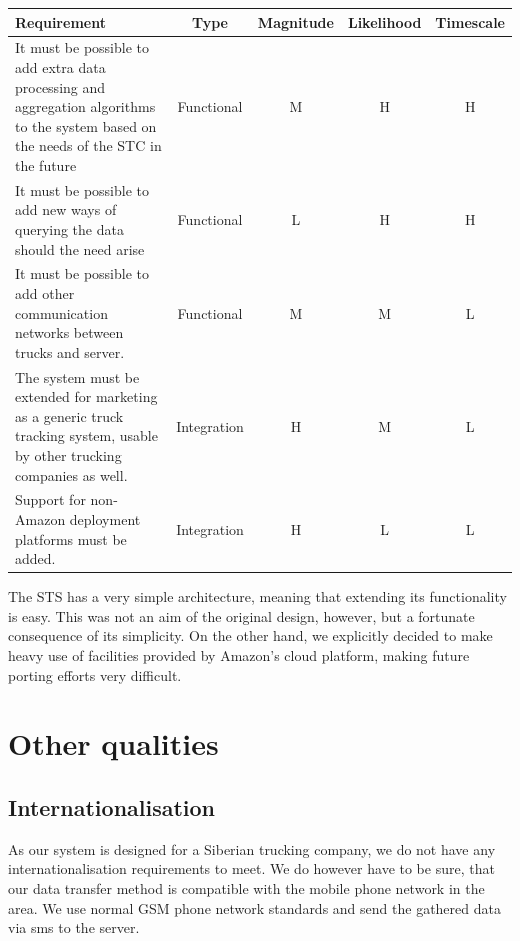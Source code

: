 \documentclass[a4paper,11pt]{report}
\begin{document}
\begin{center}
  \begin{tabular}[h!]{| p{} | c | c | c | c |}
    \hline
    \rowcolor{gray}
    Requirement & Type & Magnitude & Likelihood & Timescale \\
    \hline
    \hline
    It must be possible to add extra data processing and aggregation
    algorithms to the system based on the needs of the STC in the future & Functional & M & H & H \\
    \hline
     It must be possible to add new ways of querying the data should the need
    arise & Functional & L & H & H \\
    \hline
    It must be possible to add other communication networks between trucks and server. & Functional & M & M & L\\
    \hline
    The system must be extended for marketing as a generic truck tracking system, usable by other trucking companies as well. & Integration & H & M & L\\
    \hline
    Support for non-Amazon deployment platforms must be added. & Integration & H & L & L\\
    \hline
 \end{tabular}
\end{center}

The STS has a very simple architecture, meaning that extending its
functionality is easy.  This was not an aim of the original design,
however, but a fortunate consequence of its simplicity.  On the other
hand, we explicitly decided to make heavy use of facilities provided
by Amazon's cloud platform, making future porting efforts very
difficult.

\section{Other qualities}
\label{sec:other-qualities}

\subsection{Internationalisation}
\label{sec:internationalisation}

As our system is designed for a Siberian trucking company, we do not have any internationalisation requirements to meet. We do however have to be sure, that our data transfer method is compatible with the mobile phone network in the area. We use normal GSM phone network standards and send the gathered data via sms to the server.
\end{document}
